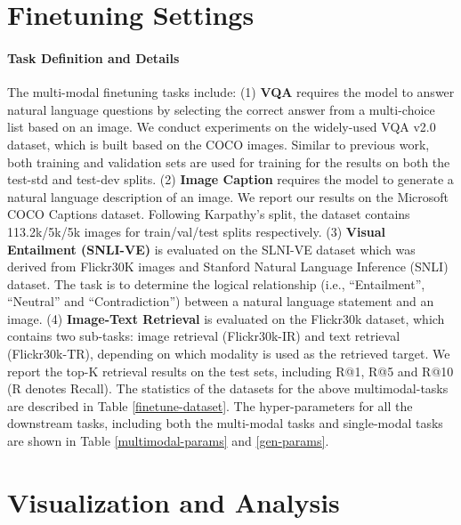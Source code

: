 \documentclass[11pt,a4paper]{article}
\begin{document}
\section{Finetuning Settings}
\label{sec:finetune}

\paragraph{Task Definition and Details}
The multi-modal finetuning tasks include:
(1) \textbf{VQA} requires the model to answer natural language questions by selecting the correct answer from a multi-choice list based on an image. We conduct experiments on the widely-used VQA v2.0 dataset, which is built based on the COCO images. Similar to previous work, both training and validation sets are used for training for the results on both the test-std and test-dev splits.
(2) \textbf{Image Caption} requires the model to generate a natural language description of an image. We report our results on the Microsoft COCO Captions dataset. Following Karpathy's split, the dataset contains 113.2k/5k/5k images for train/val/test splits respectively. 
(3) \textbf{Visual Entailment (SNLI-VE)} is evaluated on the SLNI-VE dataset which was derived from Flickr30K images and Stanford Natural Language Inference (SNLI) dataset. The task is to determine the logical relationship (i.e., ``Entailment'', ``Neutral'' and ``Contradiction'') between a natural language statement and an image.
(4) \textbf{Image-Text Retrieval} is evaluated on the Flickr30k dataset, which contains two sub-tasks: image retrieval (Flickr30k-IR) and text retrieval (Flickr30k-TR), depending on which modality is used as the retrieved target. We report the top-K retrieval results on the test sets, including R@1, R@5 and R@10 (R denotes Recall).
The statistics of the datasets for the above multimodal-tasks are described in Table \ref{finetune-dataset}. 
The hyper-parameters for all the downstream tasks, including both the multi-modal tasks and single-modal tasks are shown in Table \ref{multimodal-params} and \ref{gen-params}.





\section{Visualization and Analysis}
\label{sec:visualization}
\end{document}
